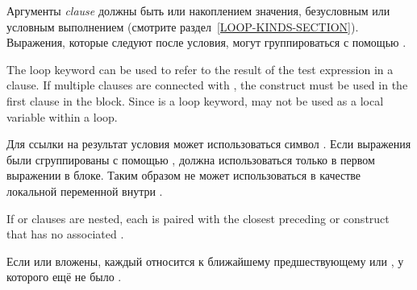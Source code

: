\begin{defloop}
Аргументы \emph{clause} должны быть или накоплением значения,
безусловным или условным выполнением (смотрите
раздел~\ref{LOOP-KINDS-SECTION}). Выражения, которые следуют после
условия, могут группироваться с помощью .

The loop keyword  can be used to refer to the result of
the test expression in a clause.  If multiple clauses are connected with ,
the  construct must be used in the first
clause in the block.  Since  is a loop keyword,  may not be used
as a local variable within a loop.

Для ссылки на результат условия может использоваться символ
. Если выражения были сгруппированы с помощью ,
 должна использоваться только в первом выражении в
блоке. Таким образом  не может использоваться в качестве
локальной переменной внутри .

If  or  clauses are nested, each  is
paired with the closest preceding  or  construct that has
no associated .

Если  или  вложены, каждый  относится к
ближайшему предшествующему  или , у которого ещё не
было .


\end{defloop}
